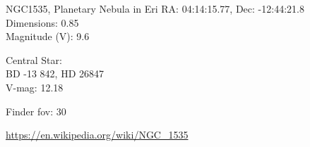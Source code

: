 \begin{block}{NGC1535, Planetary Nebula in Eri}
    RA: 04:14:15.77, Dec: -12:44:21.8 \\ 
    Dimensions: 0.85 \\ 
    Magnitude (V): 9.6


    Central Star: \\ 
      \hspace{1em}BD -13 842, HD 26847 \\ 
      \hspace{1em}V-mag: 12.18 


    Finder fov: 30 

    \url{https://en.wikipedia.org/wiki/NGC_1535} 
\end{block}
